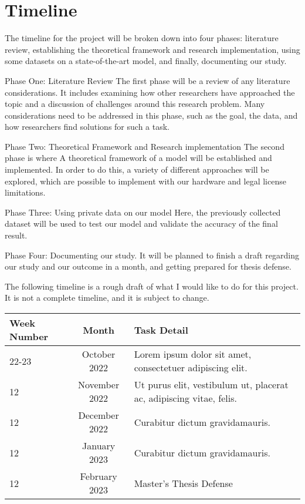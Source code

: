 
\section{Timeline}

The timeline for the project will be broken down into four phases: literature review, establishing the theoretical framework and research implementation, using some datasets on a state-of-the-art model, and finally, documenting our study.

Phase One: Literature Review
The first phase will be a review of any literature considerations. It includes examining how other researchers have approached the topic and a discussion of challenges around this research problem. Many considerations need to be addressed in this phase, such as the goal, the data, and how researchers find solutions for such a task.

Phase Two: Theoretical Framework and Research implementation
The second phase is where A theoretical framework of a model will be established and implemented. In order to do this, a variety of different approaches will be explored, which are possible to implement with our hardware and legal license limitations.

Phase Three: Using private data on our model
Here, the previously collected dataset will be used to test our model and validate the accuracy of the final result.

Phase Four: Documenting our study.
It will be planned to finish a draft regarding our study and our outcome in a month, and getting prepared for thesis defense.

The following timeline is a rough draft of what I would like to do for this project. It is not a complete timeline, and it is subject to change.


\begin{tabular}{||l|c|p{9.5cm}|}
    \cline{1-3}
    
    Week Number & Month & Task Detail \\
    \hline \hline
    22-23 & October 2022 & Lorem ipsum dolor sit amet, consectetuer adipiscing elit. \\
    \hline
    12 & November 2022 &  Ut purus elit, vestibulum ut, placerat ac, adipiscing vitae, felis. \\
    \hline
    12 & December 2022 & Curabitur dictum gravidamauris. \\
    \hline
    12 & January 2023 & Curabitur dictum gravidamauris. \\ [.3cm]
   \hline
    12 & February 2023 & Master's Thesis Defense \\ [.3cm]
    \cline{1-3}
\end{tabular}

